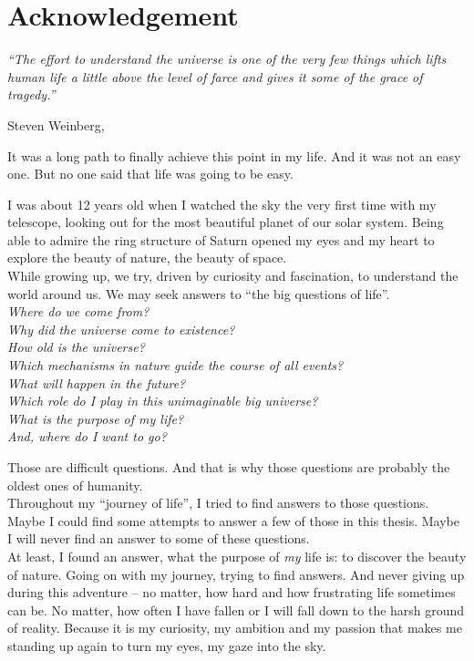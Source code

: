 \chapter*{Acknowledgement}
\thispagestyle{empty}

\epigraph{\textit{``The effort to understand the universe is one of the very few things which lifts human life a little above the level of farce and gives it some of the grace of tragedy.''}}{Steven Weinberg, \cite[Epilogue]{Weinberg1993}}

\noindent It was a long path to finally achieve this point in my life. And it was not an easy one. But no one said that life was going to be easy.

\noindent I was about 12 years old when I watched the sky the very first time with my telescope, looking out for the most beautiful planet of our solar system. Being able to admire the ring structure of Saturn opened my eyes and my heart to explore the beauty of nature, the beauty of space. \\

\noindent While growing up, we try, driven by curiosity and fascination, to understand the world around us. We may seek answers to ``the big questions of life''. \\ 

{ \itshape
\noindent Where do we come from? \\
Why did the universe come to existence? \\
How old is the universe? \\
Which mechanisms in nature guide the course of all events? \\
What will happen in the future? \\
Which role do I play in this unimaginable big universe? \\
What is the purpose of my life? \\
And, where do I want to go? \\
}

\noindent Those are difficult questions. And that is why those questions are probably the oldest ones of humanity. \\
Throughout my ``journey of life'', I tried to find answers to those questions. Maybe I could find some attempts to answer a few of those in this thesis. Maybe I will never find an answer to some of these questions. \\

\noindent At least, I found an answer, what the purpose of \textit{my} life is: to discover the beauty of nature. Going on with my journey, trying to find answers. And never giving up during this adventure -- no matter, how hard and how frustrating life sometimes can be. No matter, how often I have fallen or I will fall down to the harsh ground of reality. Because it is my curiosity, my ambition and my passion that makes me standing up again to turn my eyes, my gaze into the sky. \\ 

